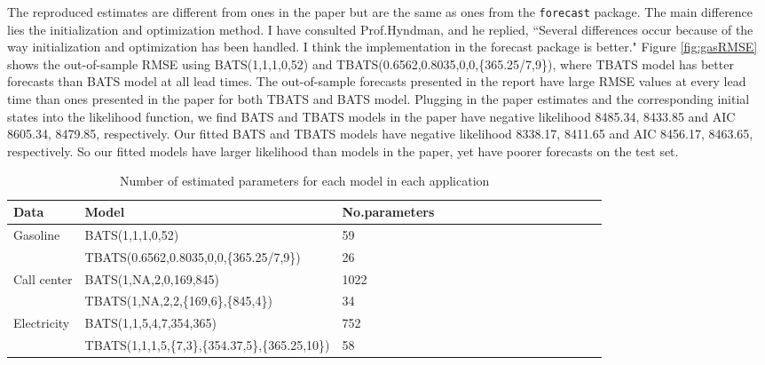 \documentclass{uwstat572}
\begin{document}
The reproduced estimates are different from ones in the paper but are the same as ones from the \texttt{forecast} package. The main difference lies the initialization and optimization method. I have consulted Prof.Hyndman, and he replied, ``Several differences occur because of the way initialization and optimization has been handled. I think the implementation in the forecast package is better." Figure \ref{fig:gasRMSE} shows the out-of-sample RMSE using BATS(1,1,1,0,52) and TBATS(0.6562,0.8035,0,0,\{365.25/7,9\}), where TBATS model has better forecasts than BATS model at all lead times. The out-of-sample forecasts presented in the report have large RMSE values at every lead time than ones presented in the paper for both TBATS and BATS model. Plugging in the paper estimates and the corresponding initial states into the likelihood function, we find BATS and TBATS models in the paper have negative likelihood 8485.34, 8433.85 and AIC 8605.34, 8479.85, respectively. Our fitted BATS and TBATS models have negative likelihood 8338.17, 8411.65 and AIC 8456.17, 8463.65, respectively. So our fitted models have larger likelihood than models in the paper, yet have poorer forecasts on the test set. 
\begin{table}[]
\small
\centering
\caption{Number of estimated parameters for each model in each application}
\label{table:number}
\begin{tabular}{l l l l l l l l l l l l l l l l}
\hline \hline
Data & Model & No.parameters \\ \hline
Gasoline & BATS(1,1,1,0,52) & 59 \\
 & TBATS(0.6562,0.8035,0,0,\{365.25/7,9\}) & 26 \\
 Call center & BATS(1,NA,2,0,169,845) & 1022  \\
  & TBATS(1,NA,2,2,\{169,6\},\{845,4\}) & 34  \\
 Electricity & BATS(1,1,5,4,7,354,365) & 752  \\
  & TBATS(1,1,1,5,\{7,3\},\{354.37,5\},\{365.25,10\}) & 58  \\ \hline
\end{tabular}
\end{table}
\end{document}
